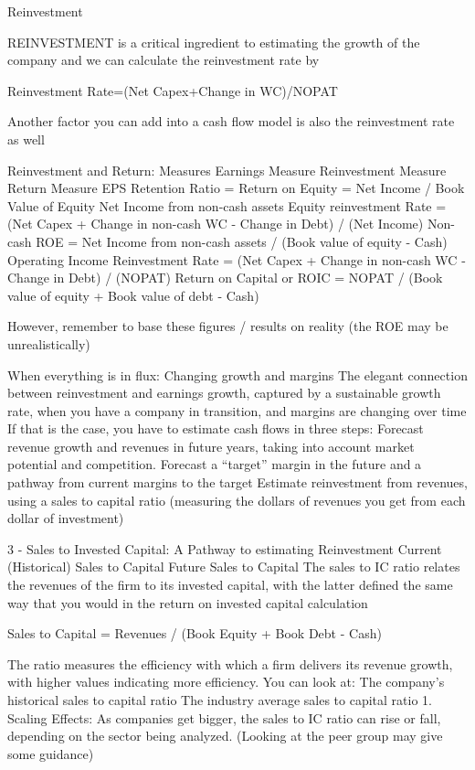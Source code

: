 \documentclass[10pt]{article}
\begin{document}
    \begin{core}{Reinvestment}

      REINVESTMENT is a critical ingredient to estimating the growth of the company and we can calculate the reinvestment rate by

      Reinvestment Rate=(Net Capex+Change in WC)/NOPAT

      Another factor you can add into a cash flow model is also the reinvestment rate as well

      Reinvestment and Return: Measures
      Earnings Measure
      Reinvestment Measure
      Return Measure
      EPS
      Retention Ratio = %
      Return on Equity = Net Income / Book Value of Equity
      Net Income from non-cash assets
      Equity reinvestment Rate = (Net Capex + Change in non-cash WC - Change in Debt) / (Net Income)
      Non-cash ROE = Net Income from non-cash assets / (Book value of equity - Cash)
      Operating Income
      Reinvestment Rate = (Net Capex + Change in non-cash WC - Change in Debt) / (NOPAT)
      Return on Capital or ROIC = NOPAT / (Book value of equity + Book value of debt - Cash)

      However, remember to base these figures / results on reality (the ROE may be unrealistically)

      When everything is in flux: Changing growth and margins
      The elegant connection between reinvestment and earnings growth, captured by a sustainable growth rate, when you have a company in transition, and margins are changing over time
      If that is the case, you have to estimate cash flows in three steps:
      Forecast revenue growth and revenues in future years, taking into account market potential and competition.
      Forecast a “target” margin in the future and a pathway from current margins to the target
      Estimate reinvestment from revenues, using a sales to capital ratio (measuring the dollars of revenues you get from each dollar of investment)

      3 - Sales to Invested Capital: A Pathway to estimating Reinvestment
      Current (Historical) Sales to Capital
      Future Sales to Capital
      The sales to IC ratio relates the revenues of the firm to its invested capital, with the latter defined the same way that you would in the return on invested capital calculation

      Sales to Capital
      = Revenues / (Book Equity + Book Debt - Cash)

      The ratio measures the efficiency with which a firm delivers its revenue growth, with higher values indicating more efficiency. You can look at:
      The company’s historical sales to capital ratio
      The industry average sales to capital ratio
      1. Scaling Effects: As companies get bigger, the sales to IC ratio can rise or fall, depending on the sector being analyzed. (Looking at the peer group may give some guidance)


\end{core}
\end{document}
